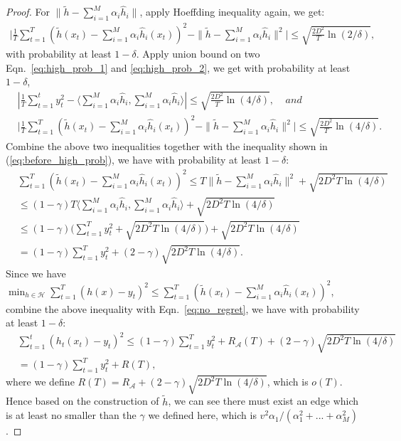 \begin{proof}
For $\|\tilde{h} - \sum_{i=1}^M \alpha_i \hat{h}_i\|$, apply Hoeffding inequality again, we get:
\begin{align}
\label{eq:high_prob_2}
\big|\frac{1}{T}\sum_{t=1}^T (\tilde{h}(x_t) - \sum_{i=1}^M\alpha_i \hat{h}_i(x_t))^2 - \|\tilde{h} - \sum_{i=1}^M\alpha_i\hat{h}_i\|^2\big| \leq \sqrt{\frac{2D^2}{T}\ln(2/\delta)},
\end{align} with probability at least $1-\delta$. Apply union bound on two Eqn.~\ref{eq:high_prob_1} and \ref{eq:high_prob_2}, we get with probability at least $1-\delta$, 
\begin{align}
&|\frac{1}{T}\sum_{t=1}^t y_t^2 - \langle\sum_{i=1}^M \alpha_i\hat{h}_i, \sum_{i=1}^M\alpha_i\hat{h}_i\rangle| \leq \sqrt{\frac{2D^2}{T}\ln(4/\delta)},\;\;\;\; and \nonumber\\
&\big|\frac{1}{T}\sum_{t=1}^T (\tilde{h}(x_t) - \sum_{i=1}^M\alpha_i \hat{h}_i(x_t))^2 - \|\tilde{h} - \sum_{i=1}^M\alpha_i\hat{h}_i\|^2\big| \leq \sqrt{\frac{2D^2}{T}\ln(4/\delta)}.
\end{align} Combine the above two inequalities together with the inequality shown in (\ref{eq:before_high_prob}), we have with probability at least $1-\delta$:
\begin{align}
&\sum_{t=1}^T (\tilde{h}(x_t) - \sum_{i=1}^M\alpha_i \hat{h}_i(x_t))^2 \leq T\|\tilde{h} - \sum_{i=1}^M\alpha_i\hat{h}_i\|^2 + \sqrt{2D^2T\ln(4/\delta)} \nonumber\\
&\leq (1-\gamma)T\langle\sum_{i=1}^M \alpha_i\hat{h}_i, \sum_{i=1}^M\alpha_i\hat{h}_i\rangle + \sqrt{2D^2T\ln(4/\delta)} \nonumber\\
& \leq (1-\gamma)\big(\sum_{t=1}^T y_t^2 + \sqrt{2D^2T\ln(4/\delta)} \big) + \sqrt{2D^2T\ln(4/\delta)} \nonumber\\
& = (1-\gamma)\sum_{t=1}^T y_t^2 + (2-\gamma)\sqrt{2D^2 T\ln(4/\delta)}. 
\end{align}
Since we have $\min_{h\in\mathcal{H}}\sum_{t=1}^T(h(x) - y_t)^2 \leq\sum_{t=1}^T (\tilde{h}(x_t) - \sum_{i=1}^M\alpha_i \hat{h}_i(x_t))^2$, combine the above inequality with Eqn.~\ref{eq:no_regret}, we have with probability at least $1-\delta$:
\begin{align}
&\sum_{t=1}^t (h_t(x_t) - y_t)^2 \leq (1-\gamma)\sum_{t=1}^Ty_t^2 + R_{\mathcal{A}}(T) + (2-\gamma)\sqrt{2D^2T\ln(4/\delta)} \nonumber\\
& = (1-\gamma)\sum_{t=1}^Ty_t^2 + R(T),
\end{align} where we define $R(T) = R_{\mathcal{A}} + (2-\gamma)\sqrt{2D^2 T\ln(4/\delta)}$, which is $o(T)$. Hence based on the construction of $\tilde{h}$, we can see there must exist an edge which is at least no smaller than the $\gamma$ we defined here, which is $v^2\alpha_1 / (\alpha_1^2 + ...+\alpha_M^2)$. 
\end{proof}


